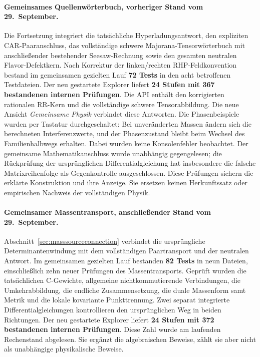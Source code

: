 \paragraph{Gemeinsames Quellenwörterbuch, vorheriger Stand vom 29.~September.}
Die Fortsetzung integriert die tatsächliche Hyperladungsantwort, den expliziten
CAR-Paaranschluss, das vollständige schwere Majorana-Tensorwörterbuch mit
anschließender bestehender Seesaw-Rechnung sowie den gesamten neutralen
Flavor-Defektkern. Nach Korrektur der linken/rechten RHP-Feldkonvention bestand
im gemeinsamen gezielten Lauf \textbf{72 Tests} in den acht betroffenen
Testdateien. Der neu gestartete Explorer liefert \textbf{24 Stufen mit
367 bestandenen internen Prüfungen}. Die API enthält den korrigierten rationalen
RR-Kern und die vollständige schwere Tensorabbildung.
Die neue Ansicht \emph{Gemeinsame Physik} verbindet diese Antworten.
Die Phasenbeispiele wurden per Tastatur durchgeschaltet: Bei unveränderten
Massen ändern sich die berechneten Interferenzwerte, und der Phasenzustand
bleibt beim Wechsel des Familienhalbwegs erhalten. Dabei wurden keine
Konsolenfehler beobachtet. Der gemeinsame Mathematikanschluss wurde unabhängig
gegengelesen; die Rückprüfung der ursprünglichen Differentialgleichung hat
insbesondere die falsche Matrixreihenfolge als Gegenkontrolle ausgeschlossen.
Diese Prüfungen sichern die erklärte Konstruktion und ihre Anzeige. Sie ersetzen
keinen Herkunftssatz oder empirischen Nachweis der vollständigen Physik.

\paragraph{Gemeinsamer Massentransport, anschließender Stand vom 29.~September.}
Abschnitt~\ref{sec:masssourceconnection} verbindet die ursprüngliche
Determinantenwindung mit dem vollständigen Paartransport und der neutralen
Antwort. Im gemeinsamen gezielten Lauf bestanden \textbf{82 Tests} in neun
Dateien, einschließlich zehn neuer Prüfungen des Massentransports. Geprüft
wurden die tatsächlichen C-Gewichte, allgemeine nichtkommutierende
Verbindungen, die Umkehrabbildung, die endliche Zusammensetzung, die duale
Massenform samt Metrik und die lokale kovariante Punkttrennung. Zwei separat
integrierte Differentialgleichungen kontrollieren den ursprünglichen Weg
in beiden Richtungen. Der neu gestartete Explorer liefert \textbf{24 Stufen
mit 372 bestandenen internen Prüfungen}. Diese Zahl wurde am laufenden
Rechenstand abgelesen. Sie ergänzt die algebraischen Beweise, zählt sie aber
nicht als unabhängige physikalische Beweise.

